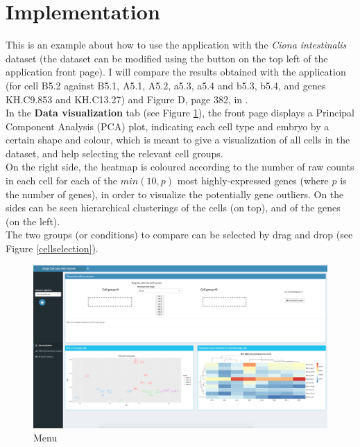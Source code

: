 \documentclass{report}
\begin{document}
{\section{Implementation}

This is an example about how to use the application with the \textit{Ciona intestinalis} dataset\cite{suyama2016singlecell} (the dataset can be modified using the button on the top left of the application front page). I will compare the results obtained with the application (for cell B5.2 against B5.1, A5.1, A5.2, a5.3, a5.4 and b5.3, b5.4, and genes KH.C9.853 and KH.C13.27) and Figure D, page 382, in \cite{matsuoka2013transcriptome}.\\

In the \textbf{Data visualization} tab (see Figure \ref{menu}),  the front page displays a Principal Component Analysis (PCA) plot, indicating each cell type and embryo by a certain shape and colour, which is meant to give a visualization of all cells in the dataset, and help selecting the relevant cell groups.\\

On the right side, the heatmap is coloured according to the number of raw counts in each cell for each of the $min(10, p)$ most highly-expressed genes (where $p$ is the number of genes), in order to visualize the potentially gene outliers\cite{poirion2016single}. On the sides can be seen hierarchical clusterings of the cells (on top), and of the genes (on the left).\\

The two groups (or conditions) to compare can be selected by drag and drop (see Figure \ref{cellselection}).\\

\begin{figure}[H]
\centering
\includegraphics[scale=0.2]{application/menu.png}
\caption{Menu}
\label{menu}
\end{figure}

}
\end{document}
